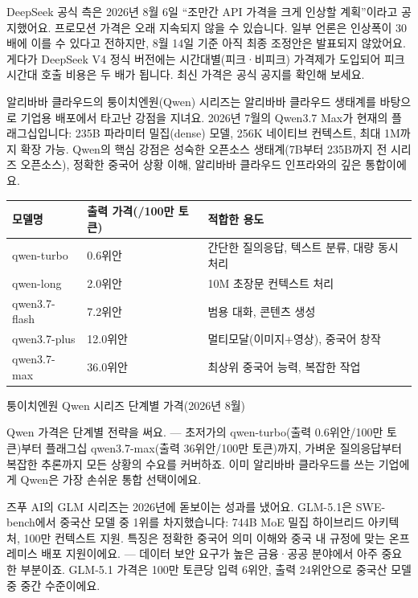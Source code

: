 DeepSeek 공식 측은 2026년 8월 6일 “조만간 API 가격을 크게 인상할 계획”이라고 공지했어요. 프로모션 가격은 오래 지속되지 않을 수 있습니다. 일부 언론은 인상폭이 30배에 이를 수 있다고 전하지만, 8월 14일 기준 아직 최종 조정안은 발표되지 않았어요. 게다가 DeepSeek V4 정식 버전에는 시간대별(피크·비피크) 가격제가 도입되어 피크 시간대 호출 비용은 두 배가 됩니다. 최신 가격은 공식 공지를 확인해 보세요.


알리바바 클라우드의 퉁이치엔원(Qwen) 시리즈는 알리바바 클라우드 생태계를 바탕으로 기업용 배포에서 타고난 강점을 지녀요. 2026년 7월의 Qwen3.7 Max가 현재의 플래그십입니다: 235B 파라미터 밀집(dense) 모델, 256K 네이티브 컨텍스트, 최대 1M까지 확장 가능. Qwen의 핵심 강점은 성숙한 오픈소스 생태계(7B부터 235B까지 전 시리즈 오픈소스), 정확한 중국어 상황 이해, 알리바바 클라우드 인프라와의 깊은 통합이에요.

\begin{center}
\begin{tabularx}{\linewidth}{|X|X|X|}
\hline
\textbf{모델명} & \textbf{출력 가격(/100만 토큰)} & \textbf{적합한 용도} \tabularnewline
\hline
qwen-turbo & 0.6위안 & 간단한 질의응답, 텍스트 분류, 대량 동시 처리 \tabularnewline
qwen-long & 2.0위안 & 10M 초장문 컨텍스트 처리 \tabularnewline
qwen3.7-flash & 7.2위안 & 범용 대화, 콘텐츠 생성 \tabularnewline
qwen3.7-plus & 12.0위안 & 멀티모달(이미지+영상), 중국어 창작 \tabularnewline
qwen3.7-max & 36.0위안 & 최상위 중국어 능력, 복잡한 작업 \tabularnewline
\hline
\end{tabularx}
\end{center}

\begin{center}\small\color{gray}퉁이치엔원 Qwen 시리즈 단계별 가격(2026년 8월)\end{center}

Qwen 가격은 단계별 전략을 써요. — 초저가의 qwen-turbo(출력 0.6위안/100만 토큰)부터 플래그십 qwen3.7-max(출력 36위안/100만 토큰)까지, 가벼운 질의응답부터 복잡한 추론까지 모든 상황의 수요를 커버하죠. 이미 알리바바 클라우드를 쓰는 기업에게 Qwen은 가장 손쉬운 통합 선택이에요.


즈푸 AI의 GLM 시리즈는 2026년에 돋보이는 성과를 냈어요. GLM-5.1은 SWE-bench에서 중국산 모델 중 1위를 차지했습니다: 744B MoE 밀집 하이브리드 아키텍처, 100만 컨텍스트 지원. 특징은 정확한 중국어 의미 이해와 중국 내 규정에 맞는 온프레미스 배포 지원이에요. — 데이터 보안 요구가 높은 금융·공공 분야에서 아주 중요한 부분이죠. GLM-5.1 가격은 100만 토큰당 입력 6위안, 출력 24위안으로 중국산 모델 중 중간 수준이에요.

